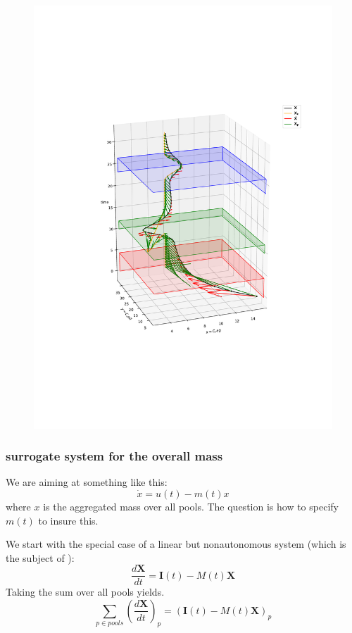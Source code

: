 \documentclass[journal abbreviation, manuscript]{copernicus}
\theoremstyle{definition}
\newcommand{\X}{\mathbf{X}}
\newcommand{\I}{\mathbf{I}}
\newcommand{\figref}[1]{Fig. \ref{#1}}
\begin{document}
\begin{figure}[t]
\includegraphics[height=.9\textheight]{figures/plot_vector_3d_X_Xc_time_z.pdf}
\caption{
  \label{Xc3D}
}
\end{figure}
\subsubsection{surrogate system for the overall mass}
We are aiming at something like this:
$$
\dot{x}=u(t)-m(t)x
$$ 
where $x$ is the aggregated mass over all pools.
The question is how to specify $m(t)$ to insure this.

We start with the special case of a linear but nonautonomous system (which is the subject of \citep{Luo2017Biogeosciences}):
$$
\frac{d \X}{d t}= \I(t) - M(t) \X 
$$
Taking the sum over all pools yields.
$$
\sum_{p \in pools} \left( \frac{d \X}{d t} \right)_p
=
\left( \I(t) - M(t) \X \right)_p
$$
\end{document}
